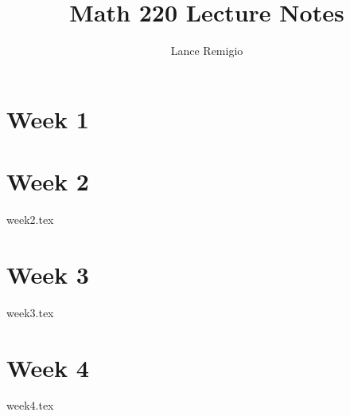 \documentclass[a4paper]{article}
\title{Math 220 Lecture Notes}
\author{Lance Remigio}
\begin{document}
\maketitle

\section{Week 1}

\section{Week 2}

{week2.tex}

\section{Week 3}

{week3.tex}

\section{Week 4}

{week4.tex}
\end{document}
